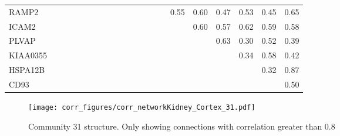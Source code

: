 \begin{longtable}{lrrrrrrrrrrrrrrrrrrrr}
RAMP2    &            &            &             &               &             &             &            &           &             &            &             &             &            &             &        0.55 &        0.60 &           0.47 &          0.53 &       0.45 &            0.65 \\
ICAM2    &            &            &             &               &             &             &            &           &             &            &             &             &            &             &             &        0.60 &           0.57 &          0.62 &       0.59 &            0.58 \\
PLVAP    &            &            &             &               &             &             &            &           &             &            &             &             &            &             &             &             &           0.63 &          0.30 &       0.52 &            0.39 \\
KIAA0355 &            &            &             &               &             &             &            &           &             &            &             &             &            &             &             &             &                &          0.34 &       0.58 &            0.42 \\
HSPA12B  &            &            &             &               &             &             &            &           &             &            &             &             &            &             &             &             &                &               &       0.32 &            0.87 \\
CD93     &            &            &             &               &             &             &            &           &             &            &             &             &            &             &             &             &                &               &            &            0.50 \\
\end{longtable}


\begin{figure}[h!]
\centering
\texttt{[image: corr\_figures/corr\_networkKidney\_Cortex\_31.pdf]}
\caption{Community 31 structure. Only showing connections with correlation greater than 0.8}
\end{figure}




